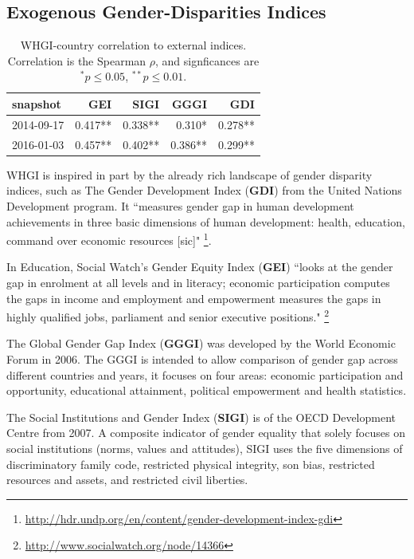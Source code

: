 \documentclass[letterpaper]{article}
\begin{document}
\subsection{Exogenous Gender-Disparities Indices}

\begin{table}
\caption{WHGI-country correlation to external indices. Correlation is the Spearman $\rho$, and signficances are $ ^*p\leq 0.05 $, $ ^{**}p\leq 0.01$.}
\label{table:scores}
\begin{tabular}{lrrrr}
\toprule
snapshot &  GEI &  SIGI &  GGGI &  GDI  \\
\midrule
2014-09-17 &  0.417** &       0.338** &          0.310* &         0.278**  \\
2016-01-03 &  0.457** &       0.402** &          0.386** &         0.299**  \\
\bottomrule
\end{tabular}
\end{table}

WHGI is inspired in part by the already rich landscape of gender disparity indices, such as The Gender Development Index (\textbf{GDI}) from the United Nations Development program. It ``measures gender gap in human development achievements in three basic dimensions of human development: health, education, command over economic resources [sic]" \footnote{\url{http://hdr.undp.org/en/content/gender-development-index-gdi}}.

\item In Education, Social Watch's Gender Equity Index (\textbf{GEI}) ``looks at the gender gap in enrolment at all levels and in literacy; economic participation computes the gaps in income and employment and empowerment measures the gaps in highly qualified jobs, parliament and senior executive positions." \footnote{\url{http://www.socialwatch.org/node/14366}}
\item The Global Gender Gap Index (\textbf{GGGI}) was developed by the World Economic Forum in 2006. The GGGI is intended to allow comparison of gender gap across different countries and years, it focuses on four areas:  economic participation and opportunity, educational attainment, political empowerment and health statistics.
\item The Social Institutions and Gender Index (\textbf{SIGI}) is of the OECD Development Centre from 2007. A composite indicator of gender equality that solely focuses on social institutions (norms, values and attitudes), SIGI uses the five dimensions of discriminatory family code, restricted physical integrity, son bias, restricted resources and assets, and restricted civil liberties.
\end{document}
